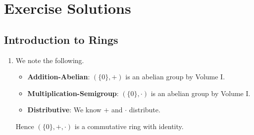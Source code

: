 \appendix
\chapter{Exercise Solutions}
\section{Introduction to Rings}
\begin{enumerate}
    \item We note the following.
    \begin{itemize}
        \item \textbf{Addition-Abelian}: $(\{0\}, +)$ is an abelian group by Volume I.
        \item \textbf{Multiplication-Semigroup}: $(\{0\}, \cdot)$ is an abelian group by Volume I.
        \item \textbf{Distributive}: We know $+$ and $\cdot$ distribute.
    \end{itemize}
    Hence $(\{0\}, +, \cdot)$ is a commutative ring with identity.
\end{enumerate}


